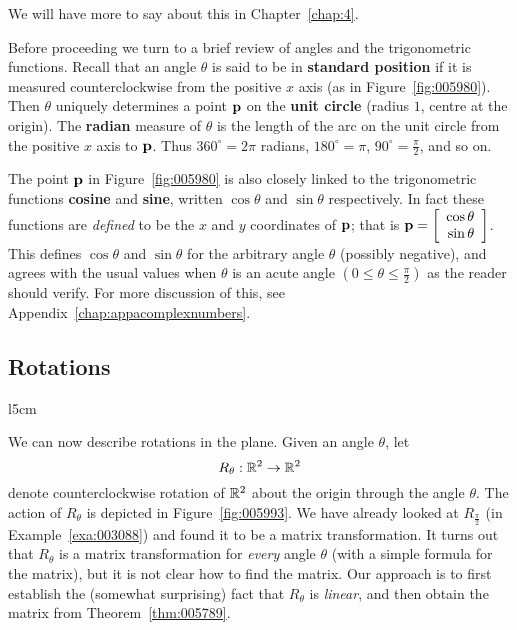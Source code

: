 \noindent We will have more to say about this in Chapter~\ref{chap:4}.

Before proceeding we turn to a brief review of angles and the trigonometric functions. Recall that an angle $\theta$ is said to be in \textbf{standard position} if it is measured counterclockwise from the positive $x$ axis (as in Figure~\ref{fig:005980}). Then $\theta$ uniquely determines a point $\textbf{p}$ on the \textbf{unit circle} (radius $1$, centre at the origin). The \textbf{radian} measure of $\theta$ is the length of the arc on the unit circle from the positive $x$ axis to $\textbf{p}$. Thus $360^\circ = 2\pi$ radians, $180^\circ = \pi$, $90^\circ = \frac{\pi}{2}$, and so on.


The point $\textbf{p}$ in Figure~\ref{fig:005980} is also closely linked to the trigonometric functions \textbf{cosine} and \textbf{sine}, written $\cos \theta$ and $\sin \theta$ respectively. In fact these functions are \textit{defined} to be the $x$ and $y$ coordinates of $\textbf{p}$; that is $\textbf{p} = \left[ \begin{array}{r}
\cos \theta \\
\sin \theta
\end{array} \right]$. 
 This defines $\cos \theta$ and $\sin \theta$ for the arbitrary angle $\theta$ (possibly negative), and agrees with the usual values when $\theta$ is an acute angle $\left(0 \leq \theta \leq \frac{\pi}{2}\right)$
 as the reader should verify. For more discussion of this, see Appendix~\ref{chap:appacomplexnumbers}.
\vspace{3em}

\subsection*{Rotations}

\begin{wrapfigure}[11]{l}{5cm} 
\centering

\caption{\label{fig:005993}}
\end{wrapfigure}

We can now describe rotations in the plane. Given an angle $\theta$, let
\begin{equation*}
R_{\theta} : \mathbb{R}^2 \to \mathbb{R}^2
\end{equation*}
denote counterclockwise rotation of $\mathbb{R}^2$ about the origin through the angle $\theta$. The action of $R_{\theta}$ is depicted in Figure~\ref{fig:005993}. We have already looked at $R_{\frac{\pi}{2}}$ (in Example~\ref{exa:003088}) and found it to be a matrix transformation. It turns out that $R_{\theta}$ is a matrix transformation for \textit{every} angle $\theta$ (with a simple formula for the matrix), but it is not clear how to find the matrix. Our approach is to first establish the (somewhat surprising) fact that $R_{\theta}$ is \textit{linear}, and then obtain the matrix from Theorem~\ref{thm:005789}.

